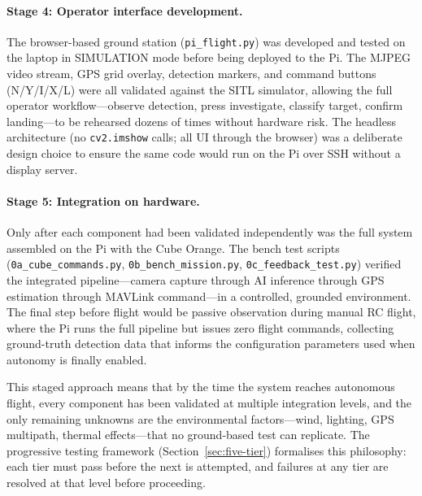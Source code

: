 \paragraph{Stage 4: Operator interface development.}
The browser-based ground station (\texttt{pi\_flight.py}) was developed and tested on the laptop in SIMULATION mode before being deployed to the Pi.  The MJPEG video stream, GPS grid overlay, detection markers, and command buttons (N/Y/I/X/L) were all validated against the SITL simulator, allowing the full operator workflow---observe detection, press investigate, classify target, confirm landing---to be rehearsed dozens of times without hardware risk.  The headless architecture (no \texttt{cv2.imshow} calls; all UI through the browser) was a deliberate design choice to ensure the same code would run on the Pi over SSH without a display server.

\paragraph{Stage 5: Integration on hardware.}
Only after each component had been validated independently was the full system assembled on the Pi with the Cube Orange.  The bench test scripts (\texttt{0a\_cube\_commands.py}, \texttt{0b\_bench\_mission.py}, \texttt{0c\_feedback\_test.py}) verified the integrated pipeline---camera capture through AI inference through GPS estimation through MAVLink command---in a controlled, grounded environment.  The final step before flight would be passive observation during manual RC flight, where the Pi runs the full pipeline but issues zero flight commands, collecting ground-truth detection data that informs the configuration parameters used when autonomy is finally enabled.

This staged approach means that by the time the system reaches autonomous flight, every component has been validated at multiple integration levels, and the only remaining unknowns are the environmental factors---wind, lighting, GPS multipath, thermal effects---that no ground-based test can replicate.  The progressive testing framework (Section~\ref{sec:five-tier}) formalises this philosophy: each tier must pass before the next is attempted, and failures at any tier are resolved at that level before proceeding.

